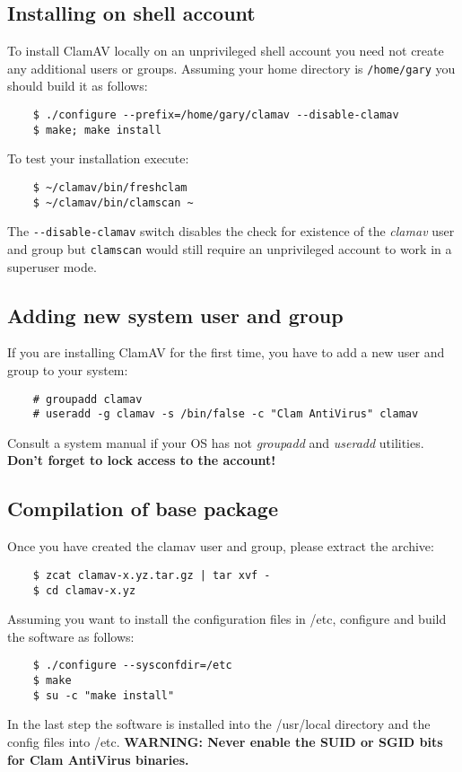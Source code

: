 \documentclass[a4paper,titlepage,12pt]{article}
\begin{document}
    \subsection{Installing on shell account}
    To install ClamAV locally on an unprivileged shell account you need not
    create any additional users or groups. Assuming your home directory is
    \verb+/home/gary+ you should build it as follows:
    \begin{verbatim}
	$ ./configure --prefix=/home/gary/clamav --disable-clamav
	$ make; make install
    \end{verbatim}
    To test your installation execute:
    \begin{verbatim}
	$ ~/clamav/bin/freshclam
	$ ~/clamav/bin/clamscan ~
    \end{verbatim}
    The \verb+--disable-clamav+ switch disables the check for existence of
    the \emph{clamav} user and group but \verb+clamscan+ would still require an
    unprivileged account to work in a superuser mode.

    \subsection{Adding new system user and group}
    If you are installing ClamAV for the first time, you have to add a new
    user and group to your system:
    \begin{verbatim}
	# groupadd clamav
	# useradd -g clamav -s /bin/false -c "Clam AntiVirus" clamav
    \end{verbatim}
    Consult a system manual if your OS has not \emph{groupadd} and
    \emph{useradd} utilities. \textbf{Don't forget to lock access to the
    account!}

    \subsection{Compilation of base package}
    Once you have created the clamav user and group, please extract the archive:
    \begin{verbatim}
	$ zcat clamav-x.yz.tar.gz | tar xvf -
	$ cd clamav-x.yz
    \end{verbatim}
    Assuming you want to install the configuration files in /etc, configure
    and build the software as follows:
    \begin{verbatim}
	$ ./configure --sysconfdir=/etc
	$ make
	$ su -c "make install"
    \end{verbatim}
    In the last step the software is installed into the /usr/local directory
    and the config files into /etc. \textbf{WARNING: Never enable the SUID
    or SGID bits for Clam AntiVirus binaries.}
\end{document}
